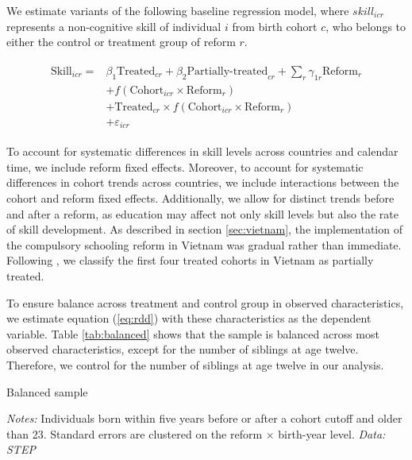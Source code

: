 We estimate variants of the following baseline regression model, where $\textit{skill}_{icr}$ represents a non-cognitive skill of individual $i$ from birth cohort $c$, who belongs to either the control or treatment group of reform $r$.


\begin{align} \label{eq:rdd}
	\begin{split}
		\text{Skill}_{icr} = & \beta_1 \text{Treated}_{cr} + \beta_2 \text{Partially-treated}_{cr} + \sum_{r} \gamma_{1r} \text{Reform}_{r} \\
		& + f(\text{Cohort}_{icr} \times \text{Reform}_r) \\
		& + \text{Treated}_{cr} \times f(\text{Cohort}_{icr} \times \text{Reform}_r) \\
		& + \varepsilon_{icr}
	\end{split}
\end{align}


To account for systematic differences in skill levels across countries and calendar time, we include reform fixed effects. Moreover, to account for systematic differences in cohort trends across countries, we include interactions between the cohort and reform fixed effects. Additionally, we allow for distinct trends before and after a reform, as education may affect not only skill levels but also the rate of skill development. As described in section \ref{sec:vietnam}, the implementation of the compulsory schooling reform in Vietnam was gradual rather than immediate. Following \citet{cornelissen_multigenerational_2022}, we classify the first four treated cohorts in Vietnam as partially treated.

To ensure balance across treatment and control group in observed characteristics, we estimate equation (\ref{eq:rdd}) with these characteristics as the dependent variable. Table \ref{tab:balanced} shows that the sample is balanced across most observed characteristics, except for the number of siblings at age twelve. Therefore, we control for the number of siblings at age twelve in our analysis.


\begin{table}[htbp]
	\caption{Balanced sample}
	\label{tab:balanced}
	\centering
	\begin{threeparttable}
			
		\begin{tablenotes}
			\footnotesize
			\item \textit{Notes:} Individuals born within five years before or after a cohort cutoff and older than 23. Standard errors are clustered on the reform $\times$ birth-year level. \textit{Data: STEP}
		\end{tablenotes}
	\end{threeparttable}
\end{table}




